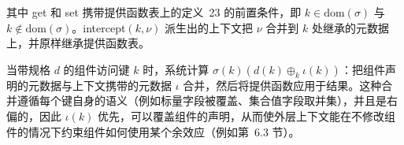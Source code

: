 其中 get 和 set 携带提供函数表上的定义~23 的前置条件，即 \(k \in \mathrm { d o m } ( \sigma )\) 与 \(k \notin \mathrm { d o m } ( \sigma )\)。intercept\(( k , \nu )\) 派生出的上下文把 \(\nu\) 合并到 \(k\) 处继承的元数据上，并原样继承提供函数表。

当带规格 \(d\) 的组件访问键 \(k\) 时，系统计算 \(\sigma ( k ) ( d ( k ) \oplus _ { k } \iota ( k ) )\)：把组件声明的元数据与上下文携带的元数据 \(\iota\) 合并，然后将提供函数应用于结果。这种合并遵循每个键自身的语义（例如标量字段被覆盖、集合值字段取并集），并且是右偏的，因此 \(\iota ( k )\) 优先，可以覆盖组件的声明，从而使外层上下文能在不修改组件的情况下约束组件如何使用某个余效应（例如第~6.3 节）。
